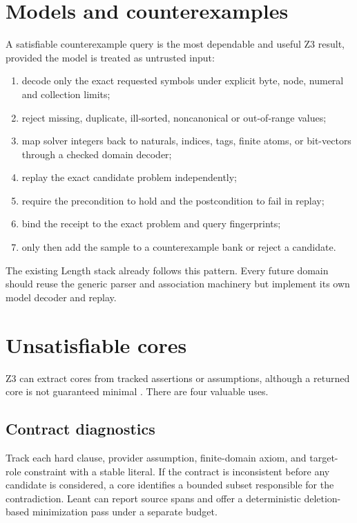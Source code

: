 \documentclass[11pt,oneside]{report}
\begin{document}
\section{Models and counterexamples}

A satisfiable counterexample query is the most dependable and useful Z3 result, provided the model is treated as untrusted input:

\begin{enumerate}[leftmargin=2em]
\item decode only the exact requested symbols under explicit byte, node, numeral and collection limits;
\item reject missing, duplicate, ill-sorted, noncanonical or out-of-range values;
\item map solver integers back to naturals, indices, tags, finite atoms, or bit-vectors through a checked domain decoder;
\item replay the exact candidate problem independently;
\item require the precondition to hold and the postcondition to fail in replay;
\item bind the receipt to the exact problem and query fingerprints;
\item only then add the sample to a counterexample bank or reject a candidate.
\end{enumerate}

The existing Length stack already follows this pattern. Every future domain should reuse the generic parser and association machinery but implement its own model decoder and replay.

\section{Unsatisfiable cores}

Z3 can extract cores from tracked assertions or assumptions, although a returned core is not guaranteed minimal \cite{z3-cores}. There are four valuable uses.

\subsection{Contract diagnostics}

Track each hard clause, provider assumption, finite-domain axiom, and target-role constraint with a stable literal. If the contract is inconsistent before any candidate is considered, a core identifies a bounded subset responsible for the contradiction. Leant can report source spans and offer a deterministic deletion-based minimization pass under a separate budget.
\end{document}
